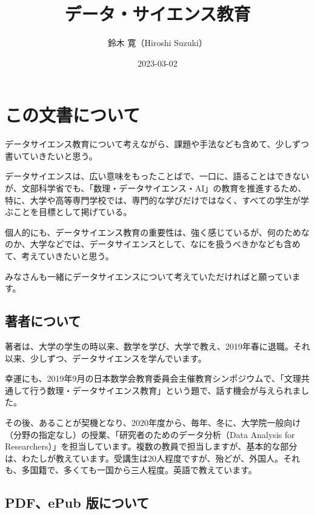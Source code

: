 \documentclass[
]{book}
\title{データ・サイエンス教育}
\author{鈴木 寛（Hiroshi Suzuki）}
\date{2023-03-02}
\theoremstyle{definition}
\theoremstyle{definition}
\theoremstyle{definition}
\theoremstyle{definition}
\theoremstyle{remark}
\begin{document}
\maketitle

{
\setcounter{tocdepth}{1}
\tableofcontents
}
\hypertarget{ux3053ux306eux6587ux66f8ux306bux3064ux3044ux3066}{%
\chapter*{この文書について}\label{ux3053ux306eux6587ux66f8ux306bux3064ux3044ux3066}}

データサイエンス教育について考えながら、課題や手法なども含めて、少しずつ書いていきたいと思う。

データサイエンスは、広い意味をもったことばで、一口に、語ることはできないが、文部科学省でも、「数理・データサイエンス・AI」の教育を推進するため、特に、大学や高等専門学校では、専門的な学びだけではなく、すべての学生が学ぶことを目標として掲げている。

個人的にも、データサイエンス教育の重要性は、強く感じているが、何のためなのか、大学などでは、データサイエンスとして、なにを扱うべきかなども含めて、考えていきたいと思う。

みなさんも一緒にデータサイエンスについて考えていただければと願っています。

\hypertarget{ux8457ux8005ux306bux3064ux3044ux3066}{%
\section*{著者について}\label{ux8457ux8005ux306bux3064ux3044ux3066}}

著者は、大学の学生の時以来、数学を学び、大学で教え、2019年春に退職。それ以来、少しずつ、データサイエンスを学んでいます。

幸運にも、2019年9月の日本数学会教育委員会主催教育シンポジウムで、「文理共通して行う数理・データサイエンス教育」という題で、話す機会が与えられました。

その後、あることが契機となり、2020年度から、毎年、冬に、大学院一般向け（分野の指定なし）の授業、「研究者のためのデータ分析（Data Analysis for Researchers）」を担当しています。複数の教員で担当しますが、基本的な部分は、わたしが教えています。受講生は20人程度ですが、殆どが、外国人。それも、多国籍で、多くても一国から三人程度。英語で教えています。

\hypertarget{pdfepub-ux7248ux306bux3064ux3044ux3066}{%
\section*{PDF、ePub 版について}\label{pdfepub-ux7248ux306bux3064ux3044ux3066}}
\end{document}
